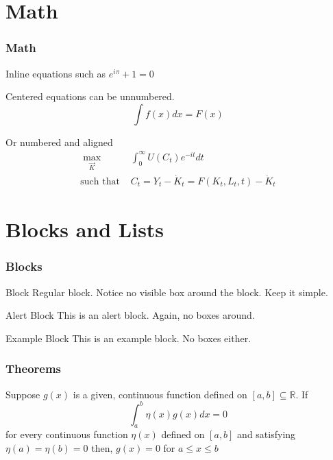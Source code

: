 \documentclass[11pt,xcolor={svgnames},aspectratio=169,usepdftitle=false]{beamer}
\let\toneitemize\itemize
\let\ttwoitemize\enditemize
\renewenvironment{itemize}{\toneitemize\addtolength{\itemsep}{0.7\baselineskip}}{\ttwoitemize}
\begin{document}
\section{Math}

\begin{frame}
	\frametitle{Math}
\begin{itemize}
	\item Inline equations such as $e^{i \pi} + 1 = 0$
	\item Centered equations can be unnumbered.
	\[
	\int f(x)dx = F(x)
	\]
	\item Or numbered and aligned
	\begin{align}
        \underset{\vec{K}}{\max} \phantom{\Omega} & \int_0^{\infty} U(C_t) e^{-it} dt \label{eqn:objective} \\
        \text{such that } & C_t = Y_t - \dot{K}_t = F(K_t,L_t,t) - \dot{K}_t \label{eqn:constraint}
    \end{align}
\end{itemize}
\end{frame}

\section{Blocks and Lists}

\begin{frame}
	\frametitle{Blocks}
\begin{block}{Block}
Regular block. Notice no visible box around the block. Keep it simple.
\end{block}

\begin{alertblock}{Alert Block}
This is an alert block. Again, no boxes around.
\end{alertblock}

\begin{exampleblock}{Example Block}
This is an example block. No boxes either.
\end{exampleblock}
\end{frame}

\begin{frame}
	\frametitle{Theorems}
\begin{theorem}
Suppose $g(x)$ is a given, continuous function defined on $[a,b]\subseteq\mathbb{R}$. If
	\[
	\int_a^b \eta(x)g(x) dx = 0
	\]
for every continuous function $\eta(x)$ defined on $[a,b]$ and satisfying $\eta(a) = \eta(b) = 0$ then, $g(x) = 0$ for $a\leq x\leq b$
\end{theorem}
\end{frame}
\end{document}
